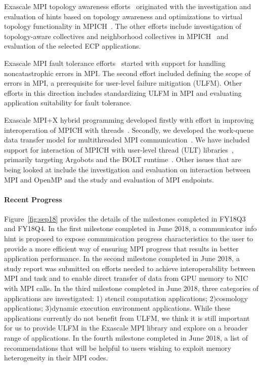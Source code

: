 Exascale MPI topology awareness efforts~\cite{Topo1,Topo2} originated
with the investigation and evaluation of hints based on topology
awareness and optimizations to virtual topology functionality in
MPICH~\cite{topo-io,topo-io2}. The other efforts include investigation
of topology-aware collectives and neighborhood collectives in
MPICH~\cite{coll} and evaluation of the selected ECP applications.

Exascale MPI fault tolerance efforts~\cite{FT1, FT2} started with
support for handling noncatastrophic errors in MPI. The second effort
included defining the scope of errors in MPI, a prerequisite for
user-level failure mitigation (ULFM). Other efforts in this direction
includes standardizing ULFM in MPI and evaluating application
suitability for fault tolerance.

Exascale MPI+X hybrid programming developed firstly with effort in
improving interoperation of MPICH with threads~\cite{interthread}.
Secondly, we developed the work-queue data transfer model for
multithreaded MPI communication~\cite{workq}. We have included support
for interaction of MPICH with user-level thread (ULT)
libraries~\cite{ULT}, primarily targeting Argobots and the BOLT
runtime~\cite{BOLT}.  Other issues that are being looked at include the
investigation and evaluation on interaction between MPI and OpenMP and
the study and evaluation of MPI endpoints.

\paragraph{Recent Progress}

Figure~\ref{fig:sep18} provides the details of the milestones completed in FY18Q3 and FY18Q4.
In the first milestone completed in June 2018, a communicator info hint is proposed to expose
communication progress characteristics to the user to provide a more efficient way of ensuring
MPI progress that results in better application  performance.
In the second milestone completed in June 2018, a study report was submitted on efforts needed to
achieve interoperability between MPI and task and to enable direct transfer of data from
GPU memory to NIC with MPI calls.
In the third milestone completed in June 2018, three categories of applications are investigated: 1)
stencil computation applications; 2)cosmology applications;  3)dynamic  execution  environment  applications.
While these applications currently do
not benefit from ULFM, we think it is still important for us to provide ULFM in the Exascale
MPI library and explore on a broader range of applications.
In the fourth milestone completed in June 2018, a list of recommendations that will be
helpful to users wishing to exploit memory heterogeneity \cite{hetero4} in their MPI codes.

